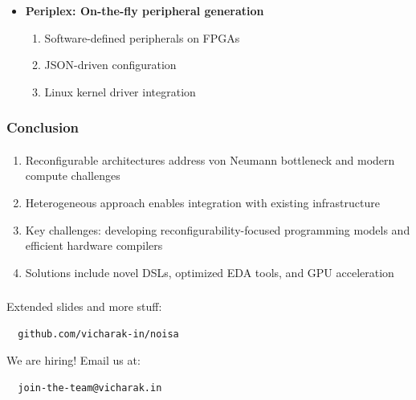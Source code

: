 \documentclass{beamer}
\begin{document}
{\begin{frame}[fragile]
\begin{itemize}
    \item \textbf{Periplex: On-the-fly peripheral generation}
      \begin{enumerate}
        \item Software-defined peripherals on FPGAs
        \item JSON-driven configuration
        \item Linux kernel driver integration
      \end{enumerate}
      \end{itemize}
\end{frame}

\begin{frame}[fragile]
  \frametitle{Conclusion}
  \framesubtitle{}
  \begin{enumerate}
    \item Reconfigurable architectures address von Neumann bottleneck and modern compute challenges
    \item Heterogeneous approach enables integration with existing infrastructure
    \item Key challenges: developing reconfigurability-focused programming models and efficient hardware compilers
    \item Solutions include novel DSLs, optimized EDA tools, and GPU acceleration
  \end{enumerate}
\end{frame}

\begin{frame}[fragile]
  \frametitle{}
  \framesubtitle{}

  Extended slides and more stuff: 

  \begin{verbatim}
  github.com/vicharak-in/noisa
  \end{verbatim}

  We are hiring! Email us at: 

  \begin{verbatim}
  join-the-team@vicharak.in
  \end{verbatim}

\end{frame}

}
\end{document}
